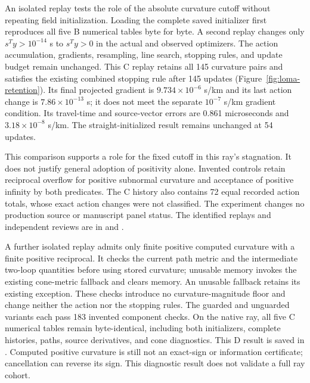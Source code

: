 An isolated replay tests the role of the absolute curvature cutoff without
repeating field initialization. Loading the complete saved initializer first
reproduces all five B numerical tables byte for byte. A second replay changes
only $s^T y>10^{-14}$ s to $s^T y>0$ in the actual and observed optimizers.
The action accumulation, gradients, resampling, line search, stopping rules,
and update budget remain unchanged. This C replay retains all 145 curvature
pairs and satisfies the existing combined stopping rule after 145 updates
(Figure~\ref{fig:loma-retention}). Its final projected gradient is
$9.734\times10^{-6}$ s/km and its last action change is
$7.86\times10^{-13}$ s; it does not meet the separate $10^{-7}$ s/km gradient
condition. Its travel-time and source-vector errors are 0.861 microseconds
and $3.18\times10^{-8}$ s/km. The straight-initialized result remains unchanged
at 54 updates.

This comparison supports a role for the fixed cutoff in this ray's stagnation.
It does not justify general adoption of positivity alone. Invented controls
retain reciprocal overflow for positive subnormal curvature and acceptance
of positive infinity by both predicates. The C history also contains 72 equal
recorded action totals, whose exact action changes were not classified.
The experiment changes no production source or manuscript panel status.
The identified replays and independent reviews are in
 and
.

A further isolated replay admits only finite positive computed curvature with
a finite positive reciprocal. It checks the current path metric and the
intermediate two-loop quantities before using stored curvature; unusable memory
invokes the existing cone-metric fallback and clears memory. An unusable fallback
retains its existing exception. These checks introduce no curvature-magnitude
floor and change neither the action nor the stopping rules. The guarded and
unguarded variants each pass 183 invented component checks. On the native ray,
all five C numerical tables remain byte-identical, including both initializers,
complete histories, paths, source derivatives, and cone diagnostics. This D
result is saved in .
Computed positive curvature is still not an exact-sign or information
certificate; cancellation can reverse its sign. This diagnostic result does
not validate a full ray cohort.

